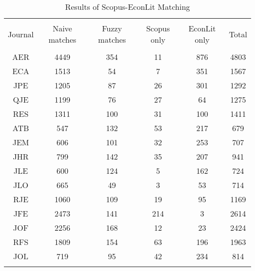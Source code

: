 
\begin{table}[!htbp] \centering 
  \caption{Results of Scopus-EconLit Matching} 
  \label{} 
\begin{tabular}{@{\extracolsep{5pt}} cccccc} 
\\[-1.8ex]\hline 
\hline \\[-1.8ex] 
Journal & Naive matches & Fuzzy matches & Scopus only & EconLit only & Total \\ 
\hline \\[-1.8ex] 
AER & 4449 & 354 & 11 & 876 & 4803 \\ 
ECA & 1513 & 54 & 7 & 351 & 1567 \\ 
JPE & 1205 & 87 & 26 & 301 & 1292 \\ 
QJE & 1199 & 76 & 27 & 64 & 1275 \\ 
RES & 1311 & 100 & 31 & 100 & 1411 \\ 
ATB & 547 & 132 & 53 & 217 & 679 \\ 
JEM & 606 & 101 & 32 & 253 & 707 \\ 
JHR & 799 & 142 & 35 & 207 & 941 \\ 
JLE & 600 & 124 & 5 & 162 & 724 \\ 
JLO & 665 & 49 & 3 & 53 & 714 \\ 
RJE & 1060 & 109 & 19 & 95 & 1169 \\ 
JFE & 2473 & 141 & 214 & 3 & 2614 \\ 
JOF & 2256 & 168 & 12 & 23 & 2424 \\ 
RFS & 1809 & 154 & 63 & 196 & 1963 \\ 
JOL & 719 & 95 & 42 & 234 & 814 \\ 
\hline \\[-1.8ex] 
\end{tabular} 
\end{table} 
